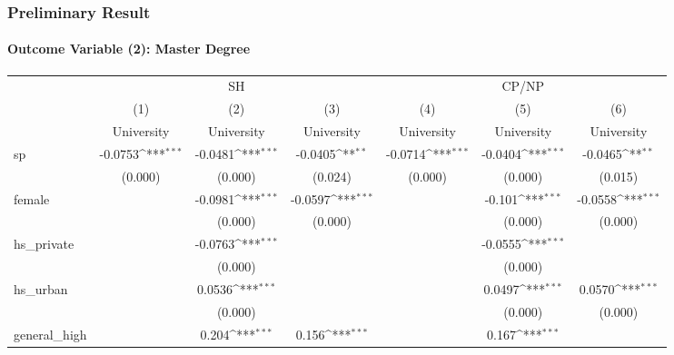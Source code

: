 \documentclass{beamer}
\def\sym#1{\ifmmode^{#1}\else\(^{#1}\)\fi}
\begin{document}
\begin{frame}[shrink=38] %
\frametitle{Preliminary Result}
\framesubtitle{Outcome Variable (2): Master Degree}

\centering
\begin{tabular}{l*{6}c}
    \toprule
    &\multicolumn{3}{c}{SH} &\multicolumn{3}{c}{CP/NP} \\
    \cmidrule(l){2-4}\cmidrule(l){5-7}
    &\multicolumn{1}{c}{(1)}&\multicolumn{1}{c}{(2)}&\multicolumn{1}{c}{(3)}&\multicolumn{1}{c}{(4)}&\multicolumn{1}{c}{(5)}&\multicolumn{1}{c}{(6)} \\
    &\multicolumn{1}{c}{University}&\multicolumn{1}{c}{University}&\multicolumn{1}{c}{University}&\multicolumn{1}{c}{University}&\multicolumn{1}{c}{University}&\multicolumn{1}{c}{University} \\
    \midrule
    sp          &     -0.0753\sym{***}&     -0.0481\sym{***}&     -0.0405\sym{**} &     -0.0714\sym{***}&     -0.0404\sym{***}&     -0.0465\sym{**} \\
                &     (0.000)         &     (0.000)         &     (0.024)         &     (0.000)         &     (0.000)         &     (0.015)         \\
    [1em]
    female      &                     &     -0.0981\sym{***}&     -0.0597\sym{***}&                     &      -0.101\sym{***}&     -0.0558\sym{***}\\
                &                     &     (0.000)         &     (0.000)         &                     &     (0.000)         &     (0.000)         \\
    [1em]
    hs\_private  &                     &     -0.0763\sym{***}&                     &                     &     -0.0555\sym{***}&                     \\
                &                     &     (0.000)         &                     &                     &     (0.000)         &                     \\
    [1em]
    hs\_urban    &                     &      0.0536\sym{***}&                     &                     &      0.0497\sym{***}&      0.0570\sym{***}\\
                &                     &     (0.000)         &                     &                     &     (0.000)         &     (0.000)         \\
    [1em]
    general\_high&                     &       0.204\sym{***}&       0.156\sym{***}&                     &       0.167\sym{***}&                     \\

\end{tabular}
\end{frame}
\end{document}
